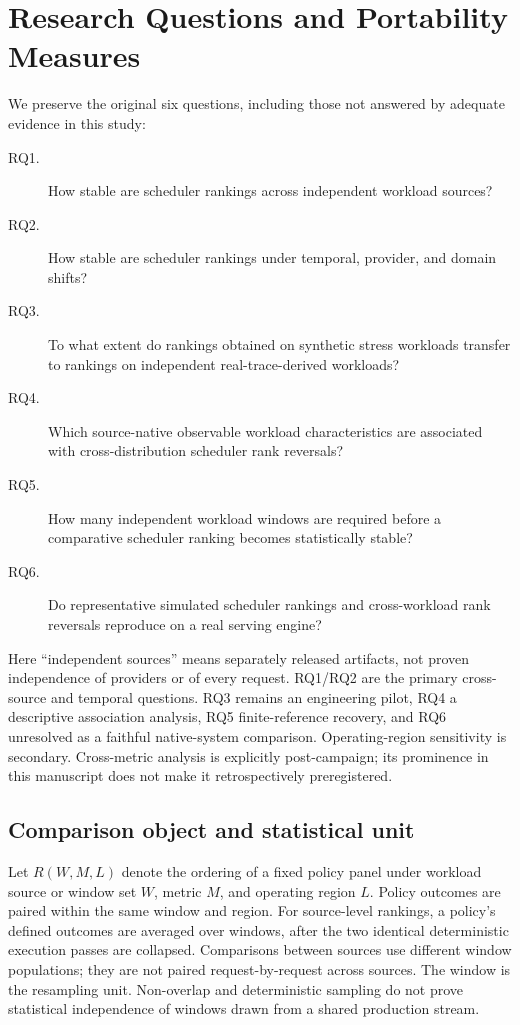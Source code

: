 \section{Research Questions and Portability Measures}\label{sec:study-design}\label{sec:rq}
We preserve the original six questions, including those not answered by
adequate evidence in this study:
\begin{description}
  \item[RQ1.] How stable are scheduler rankings across independent
    workload sources?
  \item[RQ2.] How stable are scheduler rankings under temporal, provider,
    and domain shifts?
  \item[RQ3.] To what extent do rankings obtained on synthetic stress
    workloads transfer to rankings on independent real-trace-derived
    workloads?
  \item[RQ4.] Which source-native observable workload characteristics are
    associated with cross-dis\-tribution scheduler rank reversals?
  \item[RQ5.] How many independent workload windows are required before a
    comparative scheduler ranking becomes statistically stable?
  \item[RQ6.] Do representative simulated scheduler rankings and
    cross-workload rank reversals reproduce on a real serving engine?
\end{description}
Here ``independent sources'' means separately released artifacts, not proven
independence of providers or of every request. RQ1/RQ2 are the primary
cross-source and temporal questions. RQ3 remains an engineering pilot,
RQ4 a descriptive association analysis, RQ5 finite-reference recovery,
and RQ6 unresolved as a faithful native-system comparison. Operating-region
sensitivity is secondary. Cross-metric analysis is explicitly post-campaign;
its prominence in this manuscript does not make it retrospectively preregistered.

\subsection{Comparison object and statistical unit}\label{sec:unit}
Let $R(W,M,L)$ denote the ordering of a fixed policy panel under workload
source or window set $W$, metric $M$, and operating region $L$. Policy
outcomes are paired within the same window and region. For source-level
rankings, a policy's defined outcomes are averaged over windows, after the
two identical deterministic execution passes are collapsed. Comparisons
between sources use different window populations; they are not paired
request-by-request across sources. The window is the resampling unit.
Non-overlap and deterministic sampling do not prove statistical independence
of windows drawn from a shared production stream.


